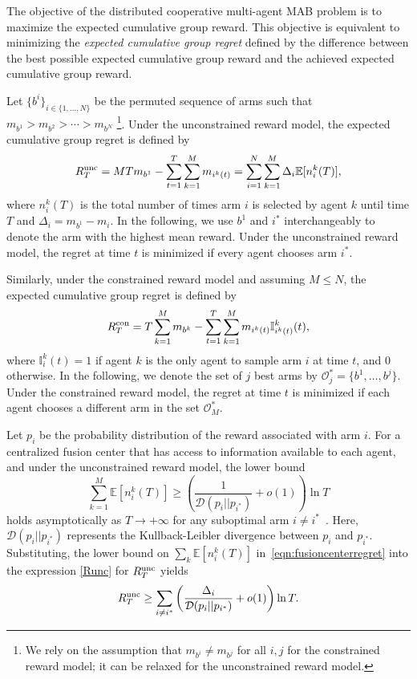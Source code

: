 \documentclass[final,5p,times,twocolumn]{elsarticle}
\theoremstyle{definition}
\def \mc {\mathcal}
\def\expt{\mathbb{E}}
\newcommand{\until}[1]{\{1,\dots, #1\}}
\newcommand{\supscr}[2]{#1^{\textup{#2}}}
\newcommand{\seqdef}[2]{\{#1\}_{#2}}
\begin{document}
The objective of the distributed cooperative multi-agent MAB problem is to maximize the expected cumulative group reward. This objective is equivalent to minimizing the \emph{expected cumulative group regret} defined by the difference between the best possible expected cumulative group reward and the achieved expected cumulative group reward. 

Let {$\seqdef{b^i}{i\in\until{N}}$} be the permuted sequence of arms such that  $m_{b^1} > m_{b^2} > \cdots > m_{b^N}$ {\footnote{{We rely on the assumption that $m_{b^i} \neq m_{b^j}$ for all $i,j$ for the constrained reward model; it can be relaxed for the unconstrained reward model.}}}.
Under the unconstrained reward model, the expected cumulative group regret is defined by
\begin{equation}
\supscr{R}{unc}_T = MT m_{b^1} - \sum_{t=1}^T \sum_{k=1}^M   m_{i^k(t)} = \sum_{i=1}^N \sum_{k=1}^M \Delta_i \expt[n_i^k(T)],
\label{Runc}
\end{equation}
where $n_i^k(T)$ is the total number of times arm $i$ is selected by  agent $k$  until time $T$ and $\Delta_i = m_{b^1}-m_i$. In the following, we use $b^1$ and $i^*$ interchangeably to denote the arm with the highest mean reward.  {Under the unconstrained reward model, the regret at time $t$ is minimized if every agent chooses arm $i^*$.}

Similarly, under the constrained reward model {and assuming $M \leq N$}, the expected cumulative group regret is defined by
\begin{equation}
\supscr{R}{con}_T = T \sum_{k=1}^M m_{b^k} - \sum_{t=1}^T \sum_{k=1}^M   m_{i^k(t)} \mathbb{I}_{i^k(t)}^k(t), 
\label{Rcon}
\end{equation}
where $\mathbb{I}_{i}^k(t) = 1$ if agent $k$ is the only agent to sample arm $i$ at time $t$, and $0$ otherwise. In the following, we  denote the set of {$j$ best arms by $\mc O_j^* =\{b^1, \ldots, b^j\}$.  Under the constrained reward model, the regret at time $t$ is minimized if each agent chooses a different arm in the set $\mc O_M^*$.}

Let $p_i$ be the probability distribution of the reward associated with arm $i$. For a centralized fusion center  that has access to information available to each agent, and under the unconstrained reward model, the  lower bound 
\begin{equation}
	\sum_{k=1}^M \expt[n_i^k (T)] \ge \left(\frac{1}{ \mathcal{D} (p_i || p_{i^*})}  +o(1) \right) \ln T \label{eqn:fusioncenterregret}
\end{equation}
holds asymptotically as $T \to +\infty$ for any suboptimal arm $i \ne i^*$~\cite{lai1985asymptotically,VA-PV-JW:87}. Here, 
$\mathcal{D} (p_i || p_{i^*})$ represents the Kullback-Leibler divergence between $p_i$ and {$p_{i^*}$}. Substituting, the lower bound on {$\sum_k \expt[n_i^k(T)]$} in~\eqref{eqn:fusioncenterregret} into the expression \eqref{Runc} for $\supscr{R}{unc}_T$ yields
\begin{equation}\label{eqn:regret-unc-lower}
\supscr{R}{unc}_T \ge  \sum_{i \ne i^*} \left(\frac{\Delta_i}{ \mathcal{D} (p_i || p_{i^*})}  +o(1) \right) \ln T. 
\end{equation}
\end{document}
